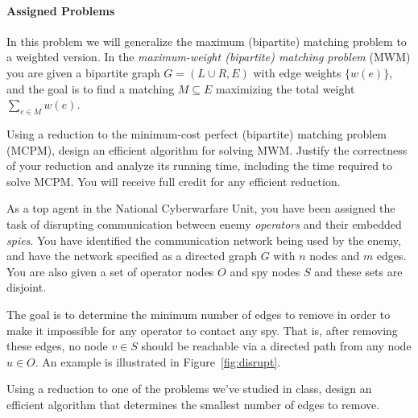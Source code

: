 \documentclass[11pt]{article}
\theoremstyle{definition}
\begin{document}
\paragraph{Assigned Problems} \phantom{.}

\begin{enumerate}[leftmargin=0pt, itemsep=3ex]
\problemitem  In this problem we will generalize the maximum (bipartite) matching problem to a weighted version.  In the \emph{maximum-weight (bipartite) matching problem} (\textsc{MWM}) you are given a bipartite graph $G = (L \cup R, E)$ with edge weights $\{w(e)\}$, and the goal is to find a matching $M \subseteq E$ maximizing the total weight $\sum_{e \in M} w(e)$.

Using a reduction to the minimum-cost perfect (bipartite) matching problem (\textsc{MCPM}), design an efficient algorithm for solving \textsc{MWM}.    Justify the correctness of your reduction and analyze its running time, including the time required to solve \textsc{MCPM}.  You will receive full credit for any efficient reduction.

\problemitem 
As a top agent in the National Cyberwarfare Unit, you have been assigned the task of disrupting communication between enemy \emph{operators} and their embedded \emph{spies}. You have identified the communication network being used by the enemy, and have the network specified as a directed graph $G$ with $n$ nodes and $m$ edges.  You are also given a set of operator nodes $O$ and spy nodes $S$ and these sets are disjoint.  

The goal is to determine the minimum number of edges to remove in order to make it impossible for any operator to contact any spy.  That is, after removing these edges, no node $v \in S$ should be reachable via a directed path from any node $u \in O$.  An example is illustrated in Figure~\ref{fig:disrupt}.

    
Using a reduction to one of the problems we've studied in class, design an efficient algorithm that determines the smallest number of edges to remove.
    


\end{enumerate}
\end{document}
